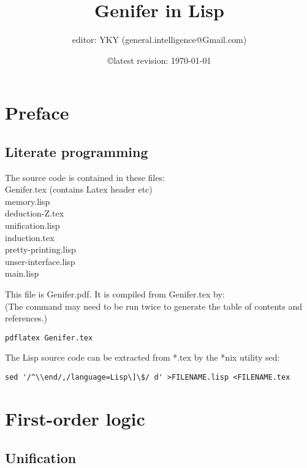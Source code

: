 \documentclass[12pt, a4paper]{report}
\title{\textbf{Genifer in Lisp}}
\author{editor: YKY (general.intelligence@Gmail.com)}
\date{\copyright \quad latest revision: \today}
\newcommand{\tab}{\hspace*{1cm} }
\begin{document}
\renewcommand{\normalsize}{\fontsize{13pt}{15pt}\selectfont}
\fontsize{13pt}{15pt} \selectfont

\maketitle
\dominitoc
\tableofcontents

\chapter{Preface}

\section{Literate programming}

The source code is contained in these files:\\
\tab Genifer.tex (contains Latex header etc) \\
\tab memory.lisp \\
\tab deduction-Z.tex \\
\tab unification.lisp \\
\tab induction.tex \\
\tab pretty-printing.lisp \\
\tab unser-interface.lisp \\
\tab main.lisp

This file is Genifer.pdf.  It is compiled from Genifer.tex by:\\
(The command may need to be run twice to generate the table of contents and references.)
\begin{lstlisting}
pdflatex Genifer.tex
\end{lstlisting}

The Lisp source code can be extracted from *.tex by the *nix utility sed:
\begin{lstlisting}[texcl]
sed '/^\\end/,/language=Lisp\]\$/ d' >FILENAME.lisp <FILENAME.tex
\end{lstlisting}



\chapter{First-order logic}

\section{Unification}
\end{document}
